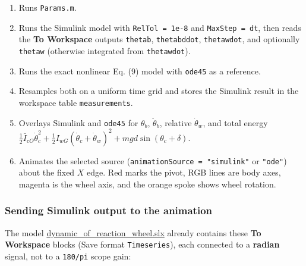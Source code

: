 \documentclass[
]{article}
\providecommand{\tightlist}{%
  \setlength{\itemsep}{0pt}\setlength{\parskip}{0pt}}
\begin{document}
\begin{enumerate}
\def\labelenumi{\arabic{enumi}.}
\tightlist
\item
  Runs \texttt{Params.m}.
\item
  Runs the Simulink model with \texttt{RelTol\ =\ 1e-8} and
  \texttt{MaxStep\ =\ dt}, then reads the \textbf{To Workspace} outputs
  \texttt{thetab}, \texttt{thetabddot}, \texttt{thetawdot}, and
  optionally \texttt{thetaw} (otherwise integrated from
  \texttt{thetawdot}).
\item
  Runs the exact nonlinear Eq. (9) model with \texttt{ode45} as a
  reference.
\item
  Resamples both on a uniform time grid and stores the Simulink result
  in the workspace table \texttt{measurements}.
\item
  Overlays Simulink and \texttt{ode45} for \(\theta_b\),
  \(\ddot\theta_b\), relative \(\dot\theta_w\), and total energy
  \(\tfrac12\bar I_{cO}\dot\theta_c^2+\tfrac12 I_{wG}(\dot\theta_c+\dot\theta_w)^2+mgd\sin(\theta_c+\delta)\).
\item
  Animates the selected source (\texttt{animationSource\ =\ "simulink"}
  or \texttt{"ode"}) about the fixed \(X\) edge. Red marks the pivot,
  RGB lines are body axes, magenta is the wheel axis, and the orange
  spoke shows wheel rotation.
\end{enumerate}

\subsubsection{Sending Simulink output to the
animation}\label{sending-simulink-output-to-the-animation}

The model
\href{Matlab\%20sim/dynamic_of_reaction_wheel.slx}{dynamic\_of\_reaction\_wheel.slx}
already contains these \textbf{To Workspace} blocks (Save format
\texttt{Timeseries}), each connected to a \textbf{radian} signal, not to
a \texttt{180/pi} scope gain:
\end{document}
